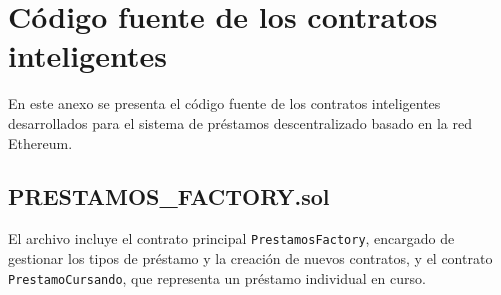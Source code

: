 \chapter{Código fuente de los contratos inteligentes}
\label{anexo:smartcontracts}

En este anexo se presenta el código fuente de los contratos inteligentes desarrollados para el sistema de préstamos descentralizado basado en la red Ethereum.

\section{PRESTAMOS\_FACTORY.sol}

El archivo  incluye el contrato principal
\texttt{PrestamosFactory}, encargado de gestionar los tipos de préstamo y la
creación de nuevos contratos, y el contrato \texttt{PrestamoCursando}, que representa
un préstamo individual en curso.


